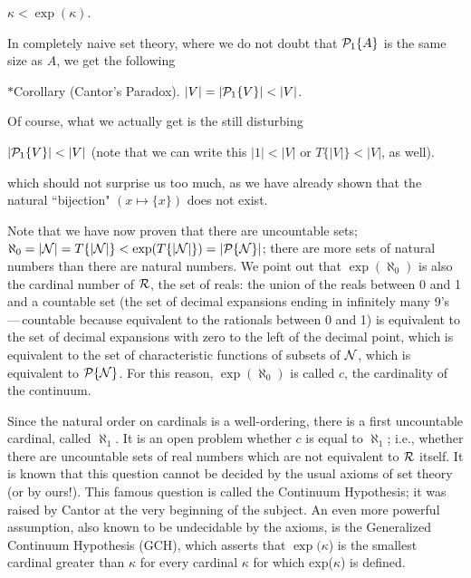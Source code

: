 \begin{cor}
 $\kappa <  \exp(\kappa)$.
\end{cor}

In completely naive set theory, where we do not doubt that
${\cal P}_1\{A\}$ is the same size as $A$, we get the following

\begin{ThmEtc}{$*$Corollary (Cantor's Paradox).}
 $|V| = |{\cal P}_1\{V\}| < |V|$.
\end{ThmEtc}

Of course, what we actually get is the still disturbing

\begin{cor}
 $|{\cal P}_1\{V\}| < |V|$  (note that we can write this $|1| < |V|$ or
 $T\{|V|\} < |V|$, as well).
\end{cor}

which should not surprise us too much, as we have already shown that
the natural ``bijection" $(x \mapsto  \{x\})$
does not exist.

Note that we have now proven that there are uncountable
sets; 
$\aleph_0 = |{\cal N}| = T\{|{\cal N}|\} < \exp(T\{|{\cal N}|\}) = |{\cal
P}\{{\cal N}\}|$; there are more
sets of natural numbers than there are natural numbers.
We point out that $\exp(\aleph_0)$ is also the cardinal
number of ${\cal R}$, the set of reals:  the union of the
reals between 0 and 1 and a countable set 
(the set of decimal expansions ending in infinitely many 9's ---\,countable
because equivalent to the
rationals between 0 and 1) is equivalent to the set of
decimal expansions with zero to the left of the decimal point, which is
equivalent to the set of characteristic
functions of subsets of ${\cal
N}$, which is equivalent to ${\cal P}\{{\cal N}\}$.  For this reason,
$\exp(\aleph_0)$ is called $c$, the cardinality of the
continuum.

Since the natural order on cardinals is a well-ordering,
there is a first uncountable cardinal,
called $\aleph_1$.  It is an open problem whether $c$ is equal to $\aleph_1$;
i.e., whether there are uncountable sets of real numbers which are not
equivalent to ${\cal R}$ itself. 
It is known that this question cannot be decided by the
usual axioms 
of set theory (or by ours!).  This famous question is called the
Continuum Hypothesis; it was raised by Cantor at
the very beginning of the subject.  An even more powerful assumption, also
known to be undecidable by the axioms, is the Generalized Continuum
Hypothesis (GCH), which asserts that
$\exp(\kappa$) is the smallest cardinal greater than 
$\kappa$ for every cardinal $\kappa$ for which exp($\kappa$) is defined.




